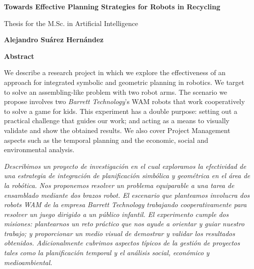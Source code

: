 \documentclass[11pt,a4paper,oldfontcommands,oneside]{memoir}
\begin{document}



\cleardoublepage


\cleardoublepage

\thispagestyle{plain}
\begin{center}
	\Large
	\textbf{Towards Effective Planning Strategies for Robots in Recycling}
	
	\vspace{0.4cm}
	\large
	Thesis for the M.Sc. in Artificial Intelligence
	
	\vspace{0.4cm}
	\textbf{Alejandro Su\'arez Hern\'andez}
	
	\vspace{0.9cm}
	\textbf{Abstract}
\end{center}

We describe a research project in which we explore the effectiveness of an
approach for integrated symbolic and geometric planning in robotics.
We target to solve an assembling-like problem with two robot arms. The
scenario we propose involves two \emph{Barrett Technology}'s WAM robots
that work cooperatively to solve a game for kids. This experiment has
a double purpose: setting out a practical challenge that guides our work; and
acting as a means to visually validate and show the obtained results.
We also cover Project Management aspects such as the temporal planning and
the economic, social and
environmental analysis.

\vspace{1cm}
\noindent
{\itshape
	Describimos un proyecto de investigaci\'on en el cual exploramos la
	efectividad de una estrategia de integraci\'on de planificaci\'on
	simb\'olica y geom\'etrica en el \'area de la rob\'otica. Nos proponemos
	resolver un problema equiparable a una tarea de ensamblado mediante dos
	brazos robot. El escenario que planteamos involucra dos robots WAM de la
	empresa Barrett Technology trabajando cooperativamente para resolver
	un juego dirigido a un p\'ublico infantil. El experimento cumple dos
	misiones: plantearnos un reto pr\'actico que nos ayude a orientar y guiar
	nuestro trabajo; y proporcionar un medio
	visual de demostrar y validar los resultados obtenidos. Adicionalmente
	cubrimos aspectos t\'ipicos de la gesti\'on de proyectos tales como
	la planificaci\'on temporal y el an\'alisis social, econ\'omico y
	medioambiental.
}
\end{document}
